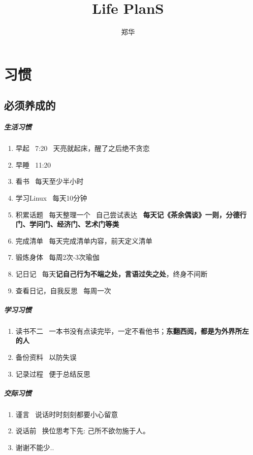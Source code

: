 \documentclass[UTF8,a4paper,8pt]{ctexbook}
\author{郑华}
\title{Life PlanS}
\begin{document}
 
 	\maketitle
	\tableofcontents
	
\chapter{习惯}
	\section{必须养成的}
		\paragraph{生活习惯}
			\begin{enumerate}
				\item 早起 \ 7:20 \ 天亮就起床，醒了之后绝不贪恋
				\item 早睡 \ 11:20
				\item 看书 \ 每天至少半小时
				\item 学习Linux  \ 每天10分钟
				
				\item 积累话题 \ 每天整理一个 \ 自己尝试表达 \ \textbf{每天记《茶余偶谈》一则，分德行门、学问门、经济门、艺术门等类}
				\item 完成清单 \ 每天完成清单内容，前天定义清单
				
				\item 锻炼身体 \ 每周2次-3次瑜伽
				\item 记日记 \ 每天\textbf{记自己行为不端之处，言语过失之处}，终身不间断
				\item 查看日记，自我反思 \ 每周一次
			\end{enumerate}
			
		\paragraph{学习习惯}
			\begin{enumerate}
				\item 读书不二 \ 一本书没有点读完毕，一定不看他书；\textbf{东翻西阅，都是为外界所左的人}
				\item 备份资料 \ 以防失误
				\item 记录过程 \ 便于总结反思
			\end{enumerate}
			
		\paragraph{交际习惯}
			\begin{enumerate}
				\item 谨言 \ 说话时时刻刻都要小心留意
				\item 说话前 \ 换位思考下先: 己所不欲勿施于人。
				\item 谢谢不能少..
			\end{enumerate}
\end{document}
